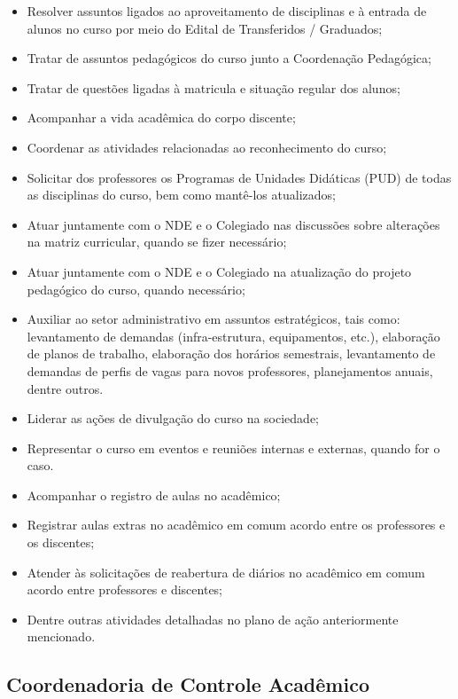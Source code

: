 \documentclass{paper}
\begin{document}
\begin{itemize}
\item Resolver assuntos ligados ao aproveitamento de disciplinas e à entrada de alunos no curso por meio do Edital de Transferidos / Graduados;
\item Tratar de assuntos pedagógicos do curso junto a Coordenação Pedagógica;
\item Tratar de questões ligadas à matricula e situação regular dos alunos;
\item Acompanhar a vida acadêmica do corpo discente;
\item Coordenar as atividades relacionadas ao reconhecimento do curso;
\item Solicitar dos professores os Programas de Unidades Didáticas (PUD) de todas as disciplinas do curso, bem como mantê-los atualizados;
\item Atuar juntamente com o NDE e o Colegiado nas discussões sobre alterações na matriz curricular, quando se fizer necessário;
\item Atuar juntamente com o NDE e o Colegiado na atualização do projeto pedagógico do curso, quando necessário;
\item Auxiliar ao setor administrativo em assuntos estratégicos, tais como: levantamento de demandas (infra-estrutura, equipamentos, etc.), elaboração de planos de trabalho, elaboração dos horários semestrais, levantamento de demandas de perfis de vagas para novos professores, planejamentos anuais, dentre outros.
\item Liderar as ações de divulgação do curso na sociedade;
\item Representar o curso em eventos e reuniões internas e externas, quando for o caso.
\item Acompanhar o registro de aulas no acadêmico;
\item Registrar aulas extras no acadêmico em comum acordo entre os professores e os discentes;
\item Atender às solicitações de reabertura de diários no acadêmico em comum acordo entre professores e discentes;
\item Dentre outras atividades detalhadas no plano de ação anteriormente mencionado.
\end{itemize}

\subsection{Coordenadoria de Controle Acadêmico}
\end{document}
